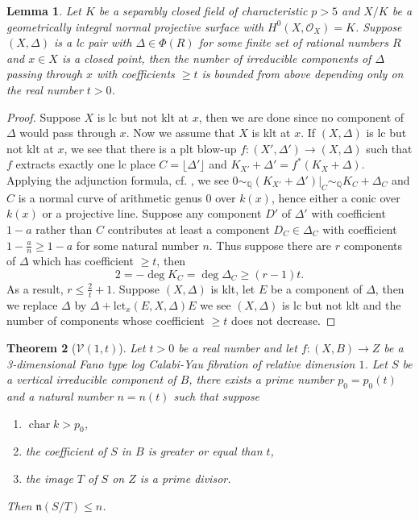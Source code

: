 \documentclass[letterpaper,reqno,12pt]{amsart}
\DeclareMathOperator{\chara}{char}
\numberwithin{equation}{section}
\theoremstyle{plain}
\newtheorem{theorem}{Theorem}[section]
\newtheorem{lemma}[theorem]{Lemma}
\begin{document}
\begin{lemma}\label{lccompn}
    Let $K$ be a separably closed field of characteristic $p>5$ and $X/K$ be a geometrically integral normal projective surface with $H^0(X,\mathcal O_X)=K$. Suppose $(X,\Delta)$ is a lc pair with $\Delta\in \Phi(R)$ for some finite set of rational numbers $R$ and $x\in X$ is a closed point, then the number of irreducible components of $\Delta$ passing through $x$ with coefficients $\geq t$ is bounded from above depending only on the real number $t>0$.
\end{lemma}
\begin{proof}
    Suppose $X$ is lc but not klt at $x$, then we are done since no component of $\Delta$ would pass through $x$. Now we assume that $X$ is klt at $x$. If $(X,\Delta)$ is lc but not klt at $x$, we see that there is a plt blow-up $f:(X',\Delta')\to (X,\Delta)$ such that $f$ extracts exactly one lc place $C=\lfloor \Delta'\rfloor$ and $K_{X'}+\Delta'=f^*(K_X+\Delta)$. Applying the adjunction formula, cf. \cite[Proposition 2.8]{DasWeakBAB}, we see $0\sim_\mathbb Q (K_{X'}+\Delta')|_{C}\sim_\mathbb QK_C+\Delta_C$ and $C$ is a normal curve of arithmetic genus $0$ over $k(x)$, hence either a conic over $k(x)$ or a projective line. Suppose any component $D'$ of $\Delta'$ with coefficient $1-a$ rather than $C$ contributes at least a component $D_C\in \Delta_C$ with coefficient $1-\frac{a}{n}\geq 1-a$ for some natural number $n$. Thus suppose there are $r$ components of $\Delta$ which has coefficient $\geq t$, then \[2=-\deg K_C=\deg \Delta_C\geq (r-1)t.\] As a result, $r\leq \frac{2}{t}+1$. Suppose $(X,\Delta)$ is klt, let $E$ be a component of $\Delta$, then we replace $\Delta$ by $\Delta+\text{lct}_x (E,X,\Delta) E$ we see $(X,\Delta)$ is lc but not klt and the number of components whose coefficient $\geq t$ does not decrease.
\end{proof}
\begin{theorem}[$\mathcal V(1,t)$]\label{V1t}
    Let $t>0$ be a real number and let $f:(X,B)\to Z$ be a 3-dimensional Fano type log Calabi-Yau fibration of relative dimension $1$. Let $S$ be a vertical irreducible component of $B$, there exists a prime number $p_0=p_0(t)$ and a natural number $n=n(t)$ such that suppose
    \begin{enumerate}
    \item $\chara k>p_0$,
        \item the coefficient of $S$ in $B$ is greater or equal than $t$,
        \item the image $T$ of $S$ on $Z$ is a prime divisor.
    \end{enumerate}
    Then $\mathfrak n(S/T)\leq n$.
\end{theorem}
\end{document}
